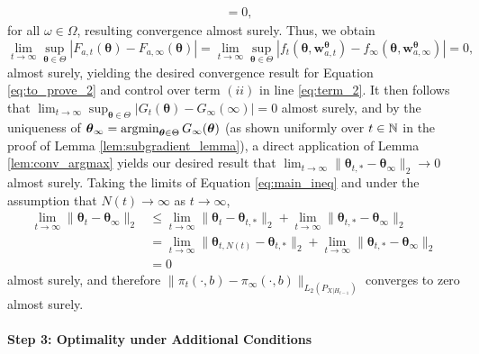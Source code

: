 \documentclass{article}
\begin{document}
\begin{appendices}
\begin{align}
    & = 0,
\end{align}
for all $\omega \in \Omega$, resulting convergence almost surely. Thus, we obtain 
\begin{equation}
    \lim_{t \rightarrow \infty}\sup_{\bm\theta \in \Theta}|F_{a,t}(\bm{\theta}) - F_{a,\infty}(\bm\theta)| = \lim_{t \rightarrow \infty}\sup_{\bm\theta \in \Theta}\left| f_t(\bm{\theta}, \bm{w}_{a,t}^{\bm\theta}) -  f_\infty(\bm{\theta}, \bm{w}_{a,\infty}^{\bm\theta}) \right| = 0,
\end{equation}
almost surely, yielding the desired convergence result for Equation \eqref{eq:to_prove_2} and control over term $(ii)$ in line \eqref{eq:term_2}. It then follows that $\lim_{t\rightarrow \infty}\sup_{\bm{\theta} \in \Theta}|G_t(\bm\theta) - G_\infty(\infty)| = 0$ almost surely,
and by the uniqueness of $\bm{\theta}_\infty = \argmin_{\bm{\theta} \in \Theta} G_\infty(\bm\theta)$ (as shown uniformly over $t \in \mathbb{N}$ in the proof of Lemma \ref{lem:subgradient_lemma}), a direct application of Lemma \ref{lem:conv_argmax} yields our desired result that $\lim_{t \rightarrow \infty} \| \bm{\theta}_{t,*} - \bm{\theta}_{\infty}\|_2 \rightarrow 0$ almost surely. Taking the limits of Equation \eqref{eq:main_ineq} and under the assumption that $N(t) \rightarrow \infty$ as $t \rightarrow \infty$, 
\begin{align}
    \lim_{t \rightarrow \infty}\| \bm{\theta}_t-\bm{\theta}_{\infty}\|_2 &\leq \lim_{t \rightarrow \infty}\| \bm{\theta}_t - \bm{\theta}_{t,*}\|_2+  \lim_{t \rightarrow \infty}\|\bm{\theta}_{t,*} - \bm{\theta}_{\infty} \|_2\\
    & =\lim_{t \rightarrow \infty}\| \bm{\theta}_{t, N(t)} - \bm{\theta}_{t,*}\|_2+  \lim_{t \rightarrow \infty}\|\bm{\theta}_{t,*} - \bm{\theta}_{\infty} \|_2\\
    & = 0
\end{align}
almost surely, and therefore $\|\pi_t(\cdot, b)- \pi_\infty(\cdot, b) \|_{L_2(P_{X|H_{t-1}})}$ converges to zero almost surely. 


\paragraph{Step 3: Optimality under Additional Conditions}


\end{appendices}
\end{document}
